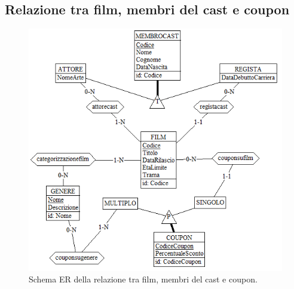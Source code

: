 \documentclass[a4paper,12pt]{report}
\begin{document}
	\subsection{Relazione tra film, membri del cast e coupon}
	\begin{figure}[H]
		\centering
		\includegraphics[width=0.9\linewidth]{ER/filmcastcoupon.png}
		\caption{Schema ER della relazione tra film, membri del cast e coupon.}
	\end{figure}
\end{document}
